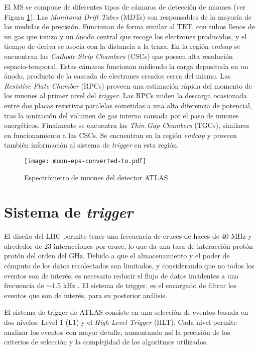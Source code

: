 El MS se compone de diferentes tipos de cámaras de detección de muones (ver Figura \ref{muon}). Las \textit{Monitored Drift Tubes} (MDTs) son responsables de la mayoría de las medidas de precisión. Funcionan de forma similar al TRT, con tubos llenos de un gas que ioniza y un ánodo central que recoge los electrones producidos, y el tiempo de deriva se asocia con la distancia a la traza. En la región \textit{endcap} se encuentran las \textit{Cathode Strip Chambers} (CSCs) que poseen alta resolución espacio-temporal. Estas cámaras funcionan midiendo la carga depositada en un ánodo, producto de la cascada de electrones creados cerca del mismo. Las \textit{Resistive Plate Chamber} (RPCs) proveen una estimación rápida del momento de los muones al primer nivel del \textit{trigger}. Las RPCs miden la descarga ocasionada entre dos placas resistivas paralelas sometidas a una alta diferencia de potencial, tras la ionización del volumen de gas interno causada por el paso de muones energéticos. Finalmente se encuentra las \textit{Thin Gap Chambers} (TGCs), similares en funcionamiento a las CSCs. Se encuentran en la región \textit{endcap} y proveen también información al sistema de \textit{trigger} en esta región.


\begin{figure}
\centering
\texttt{[image: muon-eps-converted-to.pdf]}
\caption{Espectrómetro de muones del detector ATLAS.}
\label{muon}
\end{figure}



\section{Sistema de \textit{trigger}}

El diseño del LHC permite tener una frecuencia de cruces de haces de 40 MHz y alrededor de 23 interacciones por cruce, lo que da una tasa de interacción protón-protón del orden del GHz. Debido a que el almacenamiento y el poder de cómputo de los datos recolectados son limitados, y considerando que no todos los eventos son de interés, es necesario reducir el flujo de datos incidentes a una frecuencia de $\sim 1.5$ kHz \cite{PERF-2011-02}. El sistema de trigger, es el encargado de filtrar los eventos que son de interés, para su posterior análisis. 

El sistema de trigger de ATLAS consiste en una selección de eventos basada en dos niveles: Level 1 (L1) y el \textit{High Level Trigger} (HLT). Cada nivel permite analizar los eventos con mayor detalle, aumentando así la precisión de los criterios de selección y la complejidad de los algoritmos utilizados.

